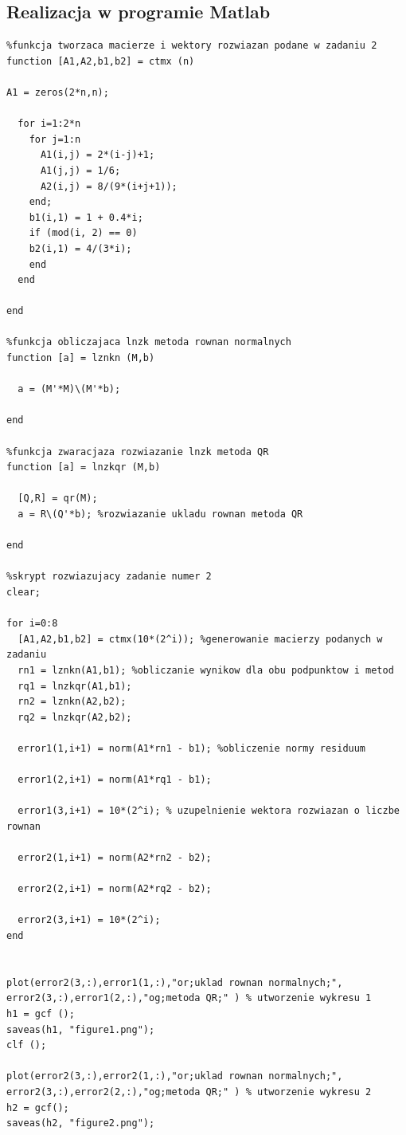 \documentclass[a4paper, 11pt]{article}
\begin{document}
\subsection{Realizacja w programie Matlab}
\begin{lstlisting}
%funkcja tworzaca macierze i wektory rozwiazan podane w zadaniu 2
function [A1,A2,b1,b2] = ctmx (n)

A1 = zeros(2*n,n);

  for i=1:2*n
    for j=1:n
      A1(i,j) = 2*(i-j)+1; 
      A1(j,j) = 1/6; 
      A2(i,j) = 8/(9*(i+j+1));
    end; 
    b1(i,1) = 1 + 0.4*i;
    if (mod(i, 2) == 0)
    b2(i,1) = 4/(3*i); 
    end
  end  

end

%funkcja obliczajaca lnzk metoda rownan normalnych
function [a] = lznkn (M,b)

  a = (M'*M)\(M'*b);

end

%funkcja zwaracjaza rozwiazanie lnzk metoda QR
function [a] = lnzkqr (M,b)

  [Q,R] = qr(M);
  a = R\(Q'*b); %rozwiazanie ukladu rownan metoda QR

end

%skrypt rozwiazujacy zadanie numer 2
clear; 

for i=0:8
  [A1,A2,b1,b2] = ctmx(10*(2^i)); %generowanie macierzy podanych w zadaniu
  rn1 = lznkn(A1,b1); %obliczanie wynikow dla obu podpunktow i metod
  rq1 = lnzkqr(A1,b1);
  rn2 = lznkn(A2,b2); 
  rq2 = lnzkqr(A2,b2);
  
  error1(1,i+1) = norm(A1*rn1 - b1); %obliczenie normy residuum 

  error1(2,i+1) = norm(A1*rq1 - b1);
  
  error1(3,i+1) = 10*(2^i); % uzupelnienie wektora rozwiazan o liczbe rownan

  error2(1,i+1) = norm(A2*rn2 - b2);

  error2(2,i+1) = norm(A2*rq2 - b2);  
  
  error2(3,i+1) = 10*(2^i);
end


plot(error2(3,:),error1(1,:),"or;uklad rownan normalnych;",
error2(3,:),error1(2,:),"og;metoda QR;" ) % utworzenie wykresu 1 
h1 = gcf ();
saveas(h1, "figure1.png");
clf ();

plot(error2(3,:),error2(1,:),"or;uklad rownan normalnych;",
error2(3,:),error2(2,:),"og;metoda QR;" ) % utworzenie wykresu 2 
h2 = gcf(); 
saveas(h2, "figure2.png");

\end{lstlisting}
\end{document}
